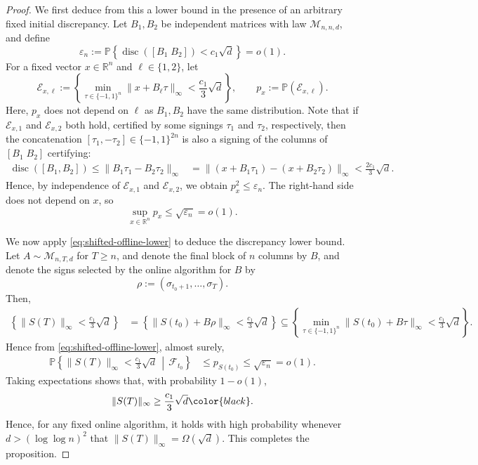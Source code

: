 \documentclass[reqno,english]{amsart}
\newcommand*{\RR}{\mathbb R}
\newcommand*{\PP}{\mathbb P}
\newcommand*{\calF}{\mathcal F}
\newcommand*{\calM}{\mathcal M}
\newcommand*{\disc}{\operatorname{disc}}
\theoremstyle{definition}
\begin{document}
\begin{proof}
We first deduce from this a lower bound in the
presence of an arbitrary fixed initial discrepancy.  Let $B_1,B_2$ be
independent matrices with law $\calM_{n,n,d}$, and define
\[
    \varepsilon_n:=
    \PP\left\{\disc([B_1\;B_2])
        <c_{1}\sqrt d\right\}=o(1).
\]
For a fixed vector $x\in\RR^n$ and $\ell \in {\{1,2\}}$, let
\[
    \mathcal{E}_{x,\ell} := \left\{
       \min_{\tau\in\{-1,1\}^n}
       \|x+B_\ell\tau\|_\infty
       <\frac{c_{1}}{3}\sqrt d
    \right\}, \qquad p_x:=
    \PP(\mathcal{E}_{x,\ell}).
\]
Here, $p_x$ does not depend on $\ell$ as $B_1,B_2$ have the same distribution. Note that if $\mathcal{E}_{x,1}$ and $\mathcal{E}_{x,2}$ both hold, certified by some signings $\tau_1$ and $\tau_2$, respectively, then
the concatenation $[\tau_1,-\tau_2]\in\{-1,1\}^{2n}$ is also a signing of the columns of
$[B_1\;B_2]$ certifying:
\[
\begin{aligned}
    \disc([B_1,B_2]) \le \|B_1\tau_1-B_2\tau_2\|_\infty
    &=\|(x+B_1\tau_1)-(x+B_2\tau_2)\|_\infty < \frac{2c_1}{3} \sqrt{d}.
\end{aligned}
\]
Hence, by independence of $\mathcal{E}_{x,1}$ and $\mathcal{E}_{x,2}$, we obtain $p_x^2\le\varepsilon_n$.
The right-hand side does not depend on $x$, so
\begin{equation}\label{eq:shifted-offline-lower}
    \sup_{x\in\RR^n}p_x
    \le\sqrt{\varepsilon_n}=o(1).
\end{equation}

We now apply \eqref{eq:shifted-offline-lower} to deduce the discrepancy lower bound. Let $A \sim \mathcal{M}_{n,T,d}$ for $T \ge n$, and denote the final block of $n$ columns by $B$, and denote the signs selected by the online algorithm for $B$ by 
\[
    \rho:=(\sigma_{t_0+1},\ldots,\sigma_T).
\]
Then, 
\[
\begin{aligned}
    \left\{\|S(T)\|_\infty
       <\frac{c_1}{3}\sqrt d\right\}
    &=
    \left\{\|S(t_0)+B\rho\|_\infty
       <\frac{c_1}{3}\sqrt d\right\} \subseteq
    \left\{
       \min_{\tau\in\{-1,1\}^n}
       \|S(t_0)+B\tau\|_\infty
       <\frac{{c_1}}{3}\sqrt d
    \right\}.
\end{aligned}
\]
Hence from \eqref{eq:shifted-offline-lower}, almost surely,
\[
\begin{aligned}
    \PP\left\{
       \|S(T)\|_\infty<\frac{c_{1}}{3}\sqrt d
       \,\middle|\,\calF_{t_0}\right\}
    &\le p_{S(t_0)}
     \le\sqrt{\varepsilon_n}
     =o(1).
\end{aligned}
\]
{Taking expectations shows that, with probability $1-o(1)$,}
\begin{equation}\label{eq:long-horizon-sqrtd}
    \|S(T)\|_\infty
    \ge\frac{{c_1}}{3}\sqrt d{\color{black}.}
\end{equation}
Hence, for any fixed online algorithm, it holds with high probability whenever $d>(\log\log n)^2$ that ${\|S(T)\|_\infty} = \Omega(\sqrt{d})$. This completes the proposition.
\end{proof}
\end{document}
